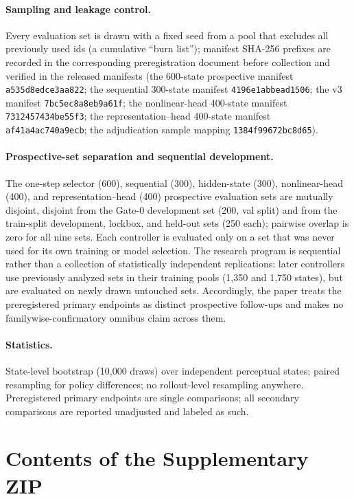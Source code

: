 \documentclass[10pt]{article}
\begin{document}
\paragraph{Sampling and leakage control.}
Every evaluation set is drawn with a fixed seed from a pool that excludes
all previously used ids (a cumulative ``burn list''); manifest SHA-256
prefixes are recorded in the corresponding preregistration document before
collection and verified in the released manifests
(the 600-state prospective manifest \texttt{a535d8edce3aa822}; the
sequential 300-state manifest \texttt{4196e1abbead1506}; the v3 manifest
\texttt{7bc5ec8a8eb9a61f}; the nonlinear-head 400-state manifest
\texttt{7312457434be55f3}; the representation--head 400-state manifest
\texttt{af41a4ac740a9ecb}; the adjudication sample mapping
\texttt{1384f99672bc8d65}).

\paragraph{Prospective-set separation and sequential development.}
The one-step selector (600), sequential (300), hidden-state (300),
nonlinear-head (400), and representation--head (400) prospective evaluation
sets are mutually disjoint, disjoint from the Gate-0 development set (200,
val split) and from the train-split development, lockbox, and held-out sets
(250 each); pairwise overlap is zero for all nine sets. Each controller is
evaluated only on a set that was never used for its own training or model
selection. The research program is sequential rather than a collection of
statistically independent replications: later controllers use previously
analyzed sets in their training pools (1,350 and 1,750 states), but are
evaluated on newly drawn untouched sets. Accordingly, the paper treats the
preregistered primary endpoints as distinct prospective follow-ups and makes
no familywise-confirmatory omnibus claim across them.

\paragraph{Statistics.}
State-level bootstrap (10{,}000 draws) over independent perceptual states;
paired resampling for policy differences; no rollout-level resampling
anywhere. Preregistered primary endpoints are single comparisons; all
secondary comparisons are reported unadjusted and labeled as such.

\section{Contents of the Supplementary ZIP}
\label{sec:zip}
\end{document}

